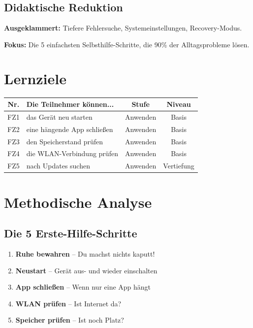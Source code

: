 \documentclass[11pt,a4paper]{article}
\begin{document}
\subsection{Didaktische Reduktion}
\textbf{Ausgeklammert:} Tiefere Fehlersuche, Systemeinstellungen, Recovery-Modus.

\textbf{Fokus:} Die 5 einfachsten Selbsthilfe-Schritte, die 90\% der Alltagsprobleme lösen.

\section{Lernziele}

\begin{tabular}{|c|p{7cm}|c|c|}
\hline
\textbf{Nr.} & \textbf{Die Teilnehmer können...} & \textbf{Stufe} & \textbf{Niveau} \\
\hline
FZ1 & das Gerät neu starten & Anwenden & Basis \\
FZ2 & eine hängende App schließen & Anwenden & Basis \\
FZ3 & den Speicherstand prüfen & Anwenden & Basis \\
FZ4 & die WLAN-Verbindung prüfen & Anwenden & Basis \\
FZ5 & nach Updates suchen & Anwenden & Vertiefung \\
\hline
\end{tabular}

\section{Methodische Analyse}

\subsection{Die 5 Erste-Hilfe-Schritte}
\begin{tippbox}
\begin{enumerate}
    \item \textbf{Ruhe bewahren} -- Du machst nichts kaputt!
    \item \textbf{Neustart} -- Gerät aus- und wieder einschalten
    \item \textbf{App schließen} -- Wenn nur eine App hängt
    \item \textbf{WLAN prüfen} -- Ist Internet da?
    \item \textbf{Speicher prüfen} -- Ist noch Platz?
\end{enumerate}
\end{tippbox}
\end{document}
